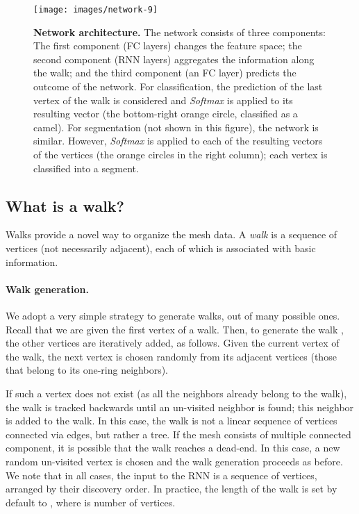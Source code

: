\documentclass[acmtog]{acmart}
\begin{document}
\begin{figure*}[ht]
\centering 
\texttt{[image: images/network-9]} 
\caption{{\bf Network architecture.} 
The network consists of three components: 
The first component (FC layers) changes the feature space; the second component (RNN layers) aggregates the information along the walk; and the third component (an FC layer) predicts the outcome of the network. 
For classification, the prediction of the last vertex of the walk is considered and {\em Softmax} is applied to its resulting vector (the bottom-right orange circle, classified as a camel).
For segmentation (not shown in this figure), the network is similar.
However, {\em Softmax} is applied to each of the resulting vectors of the vertices (the orange circles in the right column); each vertex is classified into a segment.
}
 \label{fig:NetworkArch}
\end{figure*}

\subsection{What is a walk?}
Walks provide a novel way to organize the mesh data.
A {\em walk} is a sequence of vertices (not necessarily adjacent), each of which is associated with basic information.

\paragraph{Walk generation.}
We adopt a very simple strategy to generate walks, out of many possible ones.
Recall that we are given the first vertex  of a walk.
Then, to generate the walk , the other vertices are iteratively added, as follows.
Given the current vertex of the walk, the next vertex is chosen randomly from its adjacent vertices (those that belong to its one-ring neighbors).

If such a vertex does not exist (as all the neighbors already belong to the walk),  the walk is tracked backwards until an un-visited neighbor is found; this neighbor is added to the walk. 
In this case, the walk is not a linear sequence of vertices connected via edges, but rather a tree.
If the mesh consists of multiple connected component, it is possible that the walk reaches a dead-end.
In this case, a new random  un-visited vertex is chosen and the walk generation proceeds as before.
We note that in all cases, the input to the RNN is a sequence of vertices, arranged by their discovery order.
In practice,  the length of the walk is set by default to , where  is number of vertices. 
\end{document}
